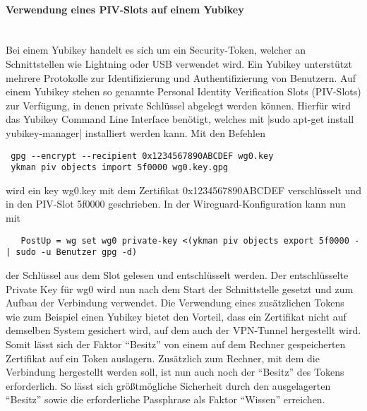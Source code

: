 \paragraph{Verwendung eines PIV-Slots auf einem Yubikey}
\noindent \\Bei einem Yubikey handelt es sich um ein Security-Token, welcher an Schnittstellen wie Lightning oder USB verwendet wird. Ein Yubikey unterst\"utzt mehrere Protokolle zur Identifizierung und Authentifizierung von Benutzern. Auf einem Yubikey stehen so genannte Personal Identity Verification Slots (PIV-Slots) zur Verf\"ugung, in denen private Schl\"ussel abgelegt werden k\"onnen. Hierf\"ur wird das Yubikey Command Line Interface ben\"otigt, welches mit |sudo apt-get install yubikey-manager| installiert werden kann. Mit den Befehlen 
\begin{verbatim}
 gpg --encrypt --recipient 0x1234567890ABCDEF wg0.key
 ykman piv objects import 5f0000 wg0.key.gpg
\end{verbatim}
wird ein key wg0.key mit dem Zertifikat 0x1234567890ABCDEF verschl\"usselt und in den PIV-Slot 5f0000 geschrieben. In der Wireguard-Konfiguration kann nun mit
\begin{verbatim}
   PostUp = wg set wg0 private-key <(ykman piv objects export 5f0000 - | sudo -u Benutzer gpg -d)
\end{verbatim}
der Schl\"ussel aus dem Slot gelesen und entschl\"usselt werden. Der entschl\"usselte Private Key für wg0 wird nun nach dem Start der Schnittstelle gesetzt  und zum Aufbau der Verbindung verwendet. Die Verwendung eines zusätzlichen Tokens wie zum Beispiel einen Yubikey bietet den Vorteil, dass ein Zertifikat nicht auf demselben System gesichert wird, auf dem auch der VPN-Tunnel hergestellt wird. Somit lässt sich der Faktor "`Besitz"' von einem auf dem Rechner gespeicherten Zertifikat auf ein Token auslagern. Zusätzlich zum Rechner, mit dem die Verbindung hergestellt werden soll, ist nun auch noch der "`Besitz"' des Tokens erforderlich. So lässt sich größtmögliche Sicherheit durch den ausgelagerten "`Besitz"' sowie die erforderliche Passphrase als Faktor "`Wissen"' erreichen.  






  
